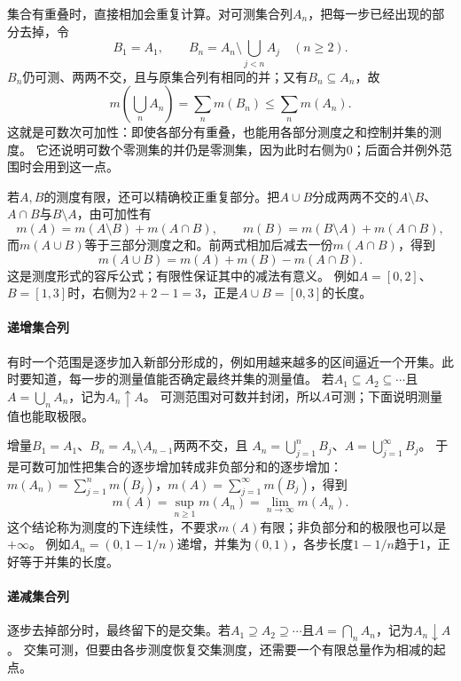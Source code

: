 集合有重叠时，直接相加会重复计算。对可测集合列$A_n$，把每一步已经出现的部分去掉，令
\[
 B_1=A_1,\qquad B_n=A_n\setminus\bigcup_{j<n}A_j\quad(n\geq2).
\]
$B_n$仍可测、两两不交，且与原集合列有相同的并；又有$B_n\subseteq A_n$，故
\[
 m\left(\bigcup_nA_n\right)=\sum_nm(B_n)\leq\sum_nm(A_n).
\]
这就是可数次可加性：即使各部分有重叠，也能用各部分测度之和控制并集的测度。
它还说明可数个零测集的并仍是零测集，因为此时右侧为$0$；后面合并例外范围时会用到这一点。

若$A,B$的测度有限，还可以精确校正重复部分。把$A\cup B$分成两两不交的$A\setminus B$、$A\cap B$与$B\setminus A$，由可加性有
\[
 m(A)=m(A\setminus B)+m(A\cap B),\qquad m(B)=m(B\setminus A)+m(A\cap B),
\]
而$m(A\cup B)$等于三部分测度之和。前两式相加后减去一份$m(A\cap B)$，得到
\[
 m(A\cup B)=m(A)+m(B)-m(A\cap B).
\]
这是测度形式的容斥公式；有限性保证其中的减法有意义。
例如$A=[0,2]$、$B=[1,3]$时，右侧为$2+2-1=3$，正是$A\cup B=[0,3]$的长度。

\paragraph{递增集合列}

有时一个范围是逐步加入新部分形成的，例如用越来越多的区间逼近一个开集。此时要知道，每一步的测量值能否确定最终并集的测量值。
若$A_1\subseteq A_2\subseteq\cdots$且$A=\bigcup_nA_n$，记为$A_n\uparrow A$。
可测范围对可数并封闭，所以$A$可测；下面说明测量值也能取极限。

增量$B_1=A_1$、$B_n=A_n\setminus A_{n-1}$两两不交，且
$A_n=\bigcup_{j=1}^nB_j$、$A=\bigcup_{j=1}^{\infty}B_j$。
于是可数可加性把集合的逐步增加转成非负部分和的逐步增加：$m(A_n)=\sum_{j=1}^nm(B_j)$，$m(A)=\sum_{j=1}^{\infty}m(B_j)$，得到
\begin{equation}
 m(A)=\sup_{n\geq1}m(A_n)=\lim_{n\to\infty}m(A_n).
 \label{eq:comb-measure-continuity-below}
\end{equation}
这个结论称为测度的下连续性，不要求$m(A)$有限；非负部分和的极限也可以是$+\infty$。
例如$A_n=(0,1-1/n)$递增，并集为$(0,1)$，各步长度$1-1/n$趋于$1$，正好等于并集的长度。

\paragraph{递减集合列}

逐步去掉部分时，最终留下的是交集。若$A_1\supseteq A_2\supseteq\cdots$且$A=\bigcap_nA_n$，记为$A_n\downarrow A$。
交集可测，但要由各步测度恢复交集测度，还需要一个有限总量作为相减的起点。

